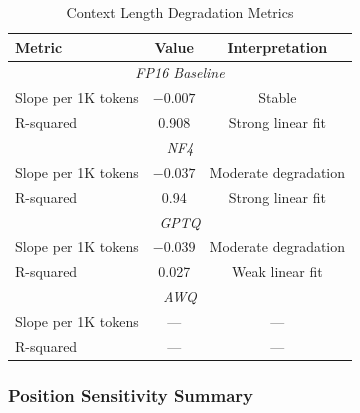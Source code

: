 \begin{table}[h]
\centering
\caption{Context Length Degradation Metrics}
\label{tab:degradation}
\begin{tabular}{@{}lcc@{}}
\toprule
\textbf{Metric} & \textbf{Value} & \textbf{Interpretation} \\
\midrule
\multicolumn{3}{c}{\textit{FP16 Baseline}} \\
\midrule
Slope per 1K tokens & $-0.007$ & Stable \\
R-squared & 0.908 & Strong linear fit \\
\midrule
\multicolumn{3}{c}{\textit{NF4}} \\
\midrule
Slope per 1K tokens & $-0.037$ & Moderate degradation \\
R-squared & 0.94 & Strong linear fit \\
\midrule
\multicolumn{3}{c}{\textit{GPTQ}} \\
\midrule
Slope per 1K tokens & $-0.039$ & Moderate degradation \\
R-squared & 0.027 & Weak linear fit \\
\midrule
\multicolumn{3}{c}{\textit{AWQ}} \\
\midrule
Slope per 1K tokens & --- & --- \\
R-squared & --- & --- \\
\bottomrule
\end{tabular}
\end{table}

\newpage
\subsubsection{Position Sensitivity Summary}

